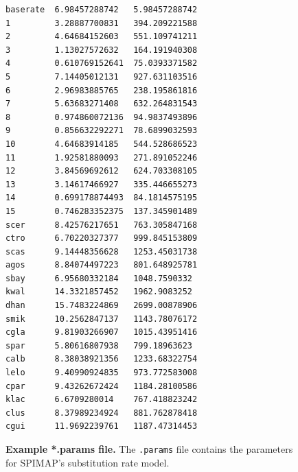 \documentclass[11pt]{article}
\newcommand{\spimap}{{\sf\scshape SPIMAP}}
\begin{document}
\begin{figure}
\begin{center}
\footnotesize
\begin{lstlisting}[frame=tblr]
baserate  6.98457288742   5.98457288742
1         3.28887700831   394.209221588
2         4.64684152603   551.109741211
3         1.13027572632   164.191940308
4         0.610769152641  75.0393371582
5         7.14405012131   927.631103516
6         2.96983885765   238.195861816
7         5.63683271408   632.264831543
8         0.974860072136  94.9837493896
9         0.856632292271  78.6899032593
10        4.64683914185   544.528686523
11        1.92581880093   271.891052246
12        3.84569692612   624.703308105
13        3.14617466927   335.446655273
14        0.699178874493  84.1814575195
15        0.746283352375  137.345901489
scer      8.42576217651   763.305847168
ctro      6.70220327377   999.845153809
scas      9.14448356628   1253.45031738
agos      8.84074497223   801.648925781
sbay      6.95680332184   1048.7590332
kwal      14.3321857452   1962.9083252
dhan      15.7483224869   2699.00878906
smik      10.2562847137   1143.78076172
cgla      9.81903266907   1015.43951416
spar      5.80616807938   799.18963623
calb      8.38038921356   1233.68322754
lelo      9.40990924835   973.772583008
cpar      9.43262672424   1184.28100586
klac      6.6709280014    767.418823242
clus      8.37989234924   881.762878418
cgui      11.9692239761   1187.47314453
\end{lstlisting}


\end{center}

\caption{{\bf Example *.params file.}  The {\tt *.params} file contains the
parameters for \spimap's substitution rate model.}
\label{fig:params}
\end{figure}




%
\end{document}
